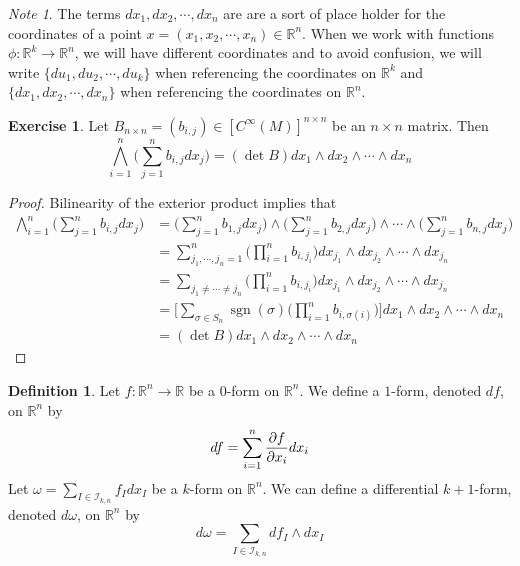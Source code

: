 \documentclass[12pt]{amsart}
\theoremstyle{definition}
\newtheorem{defn}[definition]{Definition}
\theoremstyle{remark}
\newtheorem{note}[remark]{Note}
\theoremstyle{definition}
\newtheorem{ex}[definition]{Exercise}
\newcommand{\sig}{\sigma}
\newcommand{\om}{\omega}
\newcommand{\R}{\mathbb{R}}
\newcommand{\MI}{\mathcal{I}}
\DeclareMathOperator{\sgn}{sgn}
\begin{document}
	
	\begin{note}
		The terms $dx_1, dx_2, \cdots, dx_n$ are are a sort of place holder for the coordinates of a point $x = (x_1, x_2, \cdots, x_n) \in \R^n$. When we work with functions $\phi: \R^k \rightarrow \R^n$, we will have different coordinates and to avoid confusion, we will write $\{du_1, du_2, \cdots, du_k\}$ when referencing the coordinates on $\R^k$ and $\{dx_1, dx_2, \cdots, dx_n\}$ when referencing the coordinates on $\R^n$. 
	\end{note}

	\begin{ex}
		Let $B_{n\times n} = (b_{i,j}) \in [C^{\infty}(M)]^{n \times n}$ be an $n\times n$ matrix. Then $$\bigwedge_{i=1}^n \bigg(\sum_{j=1}^n b_{i,j}dx_j\bigg) = (\det B) dx_1 \wedge dx_2 \wedge \cdots \wedge dx_n$$
	\end{ex}

	\begin{proof}
		Bilinearity of the exterior product implies that
		\begin{align*}
			\bigwedge_{i=1}^n \bigg(\sum_{j=1}^n b_{i,j}dx_j\bigg)
			 &=\bigg(\sum_{j=1}^n b_{1,j}dx_j\bigg) \wedge \bigg(\sum_{j=1}^n b_{2,j}dx_j\bigg) \wedge \cdots \wedge \bigg(\sum_{j=1}^n b_{n,j}dx_j\bigg) \\
			 &= \sum_{j_1, \cdots, j_n = 1}^n \bigg( \prod_{i=1}^n b_{i, j_i} \bigg) dx_{j_1}\wedge  dx_{j_2} \wedge \cdots \wedge  dx_{j_n} \\
			 &= \sum_{j_1 \neq \cdots \neq j_n} \bigg( \prod_{i=1}^n b_{i, j_i} \bigg) dx_{j_1}\wedge  dx_{j_2} \wedge \cdots \wedge  dx_{j_n} \\
			 &= \bigg[ \sum_{\sig \in S_n} \sgn(\sig) \bigg(\prod_{i=1}^n b_{i, \sig(i)} \bigg) \bigg] dx_{1}\wedge  dx_{2} \wedge \cdots \wedge  dx_{n} \\
			 &= (\det B) dx_{1}\wedge  dx_{2} \wedge \cdots \wedge  dx_{n}
		\end{align*} 
		
	\end{proof}

	\begin{defn}
		Let $f: \R^n \rightarrow \R$ be a $0$-form on $\R^n$. We define a $1$-form, denoted $df$, on $\R^n$ by $$df = \sum_{i = 1}^n \pdv{f}{x_i} dx_i$$
		Let $\om = \sum\limits_{I \in \MI_{k,n}} f_Idx_I$ be a $k$-form on $\R^n$. We can define a differential $k+1$-form, denoted $d \om$, on $\R^n$ by $$d\om = \sum\limits_{I \in \MI_{k,n}} df_I\wedge dx_I$$  
	\end{defn}
\end{document}
